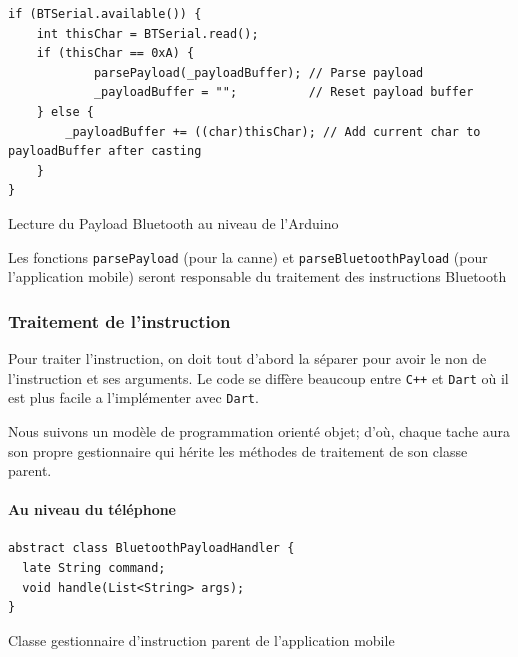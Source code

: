 \begin{code}
\begin{verbatim}
if (BTSerial.available()) {
    int thisChar = BTSerial.read();
    if (thisChar == 0xA) {
            parsePayload(_payloadBuffer); // Parse payload
            _payloadBuffer = "";          // Reset payload buffer
    } else {
        _payloadBuffer += ((char)thisChar); // Add current char to payloadBuffer after casting
    }
}        
\end{verbatim}
\caption{Lecture du Payload Bluetooth au niveau de l'Arduino}
\end{code}

Les fonctions \verb|parsePayload| (pour la canne) et \verb|parseBluetoothPayload|  (pour l'application mobile) seront responsable du traitement des instructions Bluetooth

\subsubsection{Traitement de l'instruction}
Pour traiter l'instruction, on doit tout d'abord la séparer pour avoir le non de l'instruction et ses arguments. Le code se diffère beaucoup entre \verb|C++| et \verb|Dart| où il est plus facile a l'implémenter avec \verb|Dart|.

Nous suivons un modèle de programmation orienté objet; d'où, chaque tache aura son propre gestionnaire qui hérite les méthodes de traitement de son classe parent.

\paragraph{Au niveau du téléphone}

\begin{code}
\begin{verbatim}
abstract class BluetoothPayloadHandler {
  late String command;
  void handle(List<String> args);
}  
\end{verbatim}
\caption{Classe gestionnaire d'instruction parent de l'application mobile}
\end{code}

